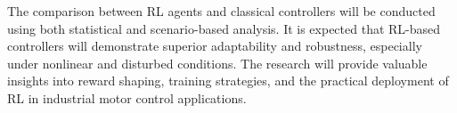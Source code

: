\documentclass[conference]{IEEEtran}
\begin{document}
The comparison between RL agents and classical controllers will be conducted using both statistical and scenario-based analysis. It is expected that RL-based controllers will demonstrate superior adaptability and robustness, especially under nonlinear and disturbed conditions. The research will provide valuable insights into reward shaping, training strategies, and the practical deployment of RL in industrial motor control applications.



\balance
\end{document}
